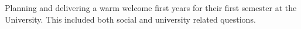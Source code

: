 Planning and delivering a warm welcome first years for their first semester
at the University. This included both social and university related questions.
